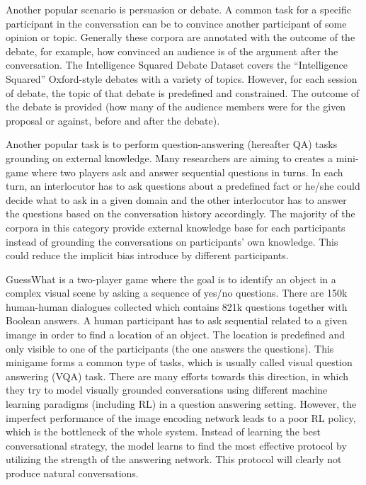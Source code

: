 \documentclass[bsc,frontabs,twoside,singlespacing,parskip,deptreport]{infthesis}     %
\begin{document}
Another popular scenario is persuasion or debate. A common task for a specific participant in the conversation can be to convince another participant of some opinion or topic. Generally these corpora are annotated with the outcome of the debate, for example, how convinced an audience is of the argument after the conversation. The Intelligence Squared Debate Dataset\cite{zhang2016conversational} covers the “Intelligence Squared” Oxford-style debates with a variety of topics. However, for each session of debate, the topic of that debate is predefined and constrained. The outcome of the debate is provided (how many of the audience members were for the given proposal or against, before and after the debate).

Another popular task is to perform question-answering (hereafter QA) tasks grounding on external knowledge. Many researchers are aiming to creates a mini-game where two players ask and answer sequential questions in turns. In each turn, an interlocutor has to ask questions about a predefined fact or he/she could decide what to ask in a given domain and the other interlocutor has to answer the questions based on the conversation history accordingly. The majority of the corpora in this category provide external knowledge base for each participants instead of grounding the conversations on participants' own knowledge. This could reduce the implicit bias introduce by different participants.

GuessWhat\cite{de2017guesswhat} is a two-player game where the goal is to identify an object in a complex visual scene by asking a sequence of yes/no questions. There are 150k human-human dialogues collected which contains 821k questions together with Boolean answers. A human participant has to ask sequential related to a given imange in order to find a location of an object. The location is predefined and only visible to one of the participants (the one answers the questions). This minigame forms a common type of tasks, which is usually called visual question answering (VQA) task. There are many efforts towards this direction\cite{strub2017end,shekhar2017foil,reddy2019coqa,zhou2018dataset,de2017guesswhat,das2017visual,das2017learning}, in which they try to model visually grounded conversations using different machine learning paradigms (including RL) in a question answering setting. However, the imperfect performance of the image encoding network leads to a poor RL policy, which is the bottleneck of the whole system. Instead of learning the best conversational strategy, the model learns to find the most effective protocol by utilizing the strength of the answering network. This protocol will clearly not produce natural conversations.
\end{document}

